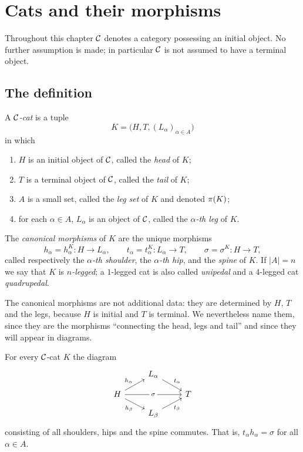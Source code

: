 \chapter{Cats and their morphisms}\label{ch:cats}

\begin{assumption}\label{ass:ch3}
Throughout this chapter $\mathcal{C}$ denotes a category possessing an initial object.
No further assumption is made; in particular $\mathcal{C}$ is not assumed to have a
terminal object.
\end{assumption}

\section{The definition}\label{sec:def-cat}

\begin{definition}\label{def:cat}
A \emph{$\mathcal{C}$-cat} is a tuple
\[
K=\bigl(H,T,(L_\alpha)_{\alpha\in A}\bigr)
\]
in which
\begin{enumerate}
\item $H$ is an initial object of $\mathcal{C}$, called the \emph{head} of $K$;
\item $T$ is a terminal object of $\mathcal{C}$, called the \emph{tail} of $K$;
\item $A$ is a small set, called the \emph{leg set} of $K$ and denoted $\pi(K)$;
\item for each $\alpha\in A$, $L_\alpha$ is an object of $\mathcal{C}$, called the
  \emph{$\alpha$-th leg} of $K$.
\end{enumerate}
The \emph{canonical morphisms} of $K$ are the unique morphisms
\[
h_\alpha=h^K_\alpha\colon H\to L_\alpha,\qquad
t_\alpha=t^K_\alpha\colon L_\alpha\to T,\qquad
\sigma=\sigma^K\colon H\to T,
\]
called respectively the \emph{$\alpha$-th shoulder}, the \emph{$\alpha$-th
hip}, and the \emph{spine} of $K$. If $|A|=n$ we say that $K$ is
\emph{$n$-legged}; a $1$-legged cat is also called \emph{unipedal} and a
$4$-legged cat \emph{quadrupedal}.
\end{definition}

The canonical morphisms are not additional data: they are determined by $H$,
$T$ and the legs, because $H$ is initial and $T$ is terminal. We nevertheless
name them, since they are the morphisms ``connecting the head, legs and tail''
and since they will appear in diagrams.

\begin{proposition}\label{prop:cat-diagram}
For every $\mathcal{C}$-cat $K$ the diagram
\begin{equation}\label{eq:feline-diagram}
\begin{tikzcd}[row sep=small]
  & L_\alpha \arrow[dr, "t_\alpha"] & \\
  H \arrow[ur, "h_\alpha"] \arrow[dr, "h_\beta"'] \arrow[rr, "\sigma" description] & & T \\
  & L_\beta \arrow[ur, "t_\beta"'] &
\end{tikzcd}
\end{equation}
consisting of all shoulders, hips and the spine commutes. That is,
$t_\alpha h_\alpha=\sigma$ for all $\alpha\in A$.
\end{proposition}

